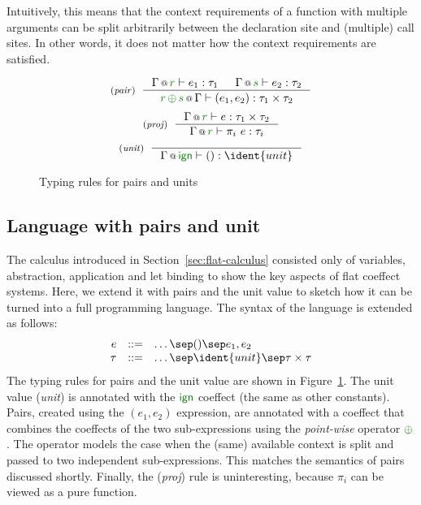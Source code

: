 \noindent
Intuitively, this means that the context requirements of a function with multiple arguments can be 
split arbitrarily between the declaration site and (multiple) call sites. In other words, it does
not matter how the context requirements are satisfied.


\begin{figure}[t]
\begin{equation*}
\tyrule{pair}
  {\coctx{\Gamma}{\cclrd{r}} \vdash e_1 : \tau_1 & \coctx{\Gamma}{\cclrd{s}} \vdash e_2 : \tau_2}
  {\coctx{\cclrd{r}\,\cpar\,\cclrd{s}}{\Gamma} \vdash (e_1, e_2) : \tau_1 \times \tau_2 }
\end{equation*}
\begin{equation*}
\tyrule{proj}
  {\coctx{\Gamma}{\cclrd{r}} \vdash e : \tau_1 \times \tau_2 }
  {\coctx{\Gamma}{\cclrd{r}} \vdash \pi_i~e : \tau_{i} }
\end{equation*}
\begin{equation*}
\tyrule{unit}
  {}
  {\coctx{\Gamma}{\czero} \vdash () : \ident{unit} }
\end{equation*}

\caption{Typing rules for pairs and units}
\label{fig:flat-ext-types}
\end{figure}


\subsection{Language with pairs and unit}

The calculus introduced in Section~\ref{sec:flat-calculus} consisted only of variables, abstraction, 
application and let binding to show the key aspects of flat coeffect systems. Here, we extend it 
with pairs and the unit value to sketch how it can be turned into a full programming language.
The syntax of the language is extended as follows:
%
\begin{equation*}
\begin{array}{rcl}
e &::=& \ldots \sep () \sep e_1, e_2 \\
\tau &::=& \ldots \sep \ident{unit} \sep \tau \times \tau
\end{array}
\end{equation*}
%
The typing rules for pairs and the unit value are shown in Figure~\ref{fig:flat-ext-types}.
The unit value (\emph{unit}) is annotated with the $\czero$ coeffect (the same as other constants).
Pairs, created using the $(e_1, e_2)$ expression, are annotated with a coeffect that combines
the coeffects of the two sub-expressions using the \emph{point-wise} operator $\cpar$. The operator
models the case when the (same) available context is split and passed to two independent 
sub-expressions. This matches the semantics of pairs discussed shortly. Finally, the (\emph{proj})
rule is uninteresting, because $\pi_i$ can be viewed as a pure function.

